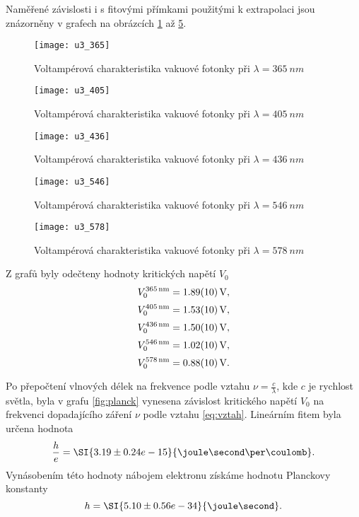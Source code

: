 \documentclass{protokol}
\begin{document}
      Naměřené závislosti i s fitovými přímkami použitými k extrapolaci jsou znázorněny v grafech na obrázcích \ref{fig:u3_365} až \ref{fig:u3_578}.

      \begin{figure}[H]
        \centering
        \texttt{[image: u3\_365]}
        \caption{Voltampérová charakteristika vakuové fotonky při $\lambda = \SI{365}{nm}$}
        \label{fig:u3_365}
      \end{figure}

      \begin{figure}[H]
        \centering
        \texttt{[image: u3\_405]}
        \caption{Voltampérová charakteristika vakuové fotonky při $\lambda = \SI{405}{nm}$}
        \label{fig:u3_405}
      \end{figure}

      \begin{figure}[H]
        \centering
        \texttt{[image: u3\_436]}
        \caption{Voltampérová charakteristika vakuové fotonky při $\lambda = \SI{436}{nm}$}
        \label{fig:u3_436}
      \end{figure}

      \begin{figure}[H]
        \centering
        \texttt{[image: u3\_546]}
        \caption{Voltampérová charakteristika vakuové fotonky při $\lambda = \SI{546}{nm}$}
        \label{fig:u3_546}
      \end{figure}

      \begin{figure}[H]
        \centering
        \texttt{[image: u3\_578]}
        \caption{Voltampérová charakteristika vakuové fotonky při $\lambda = \SI{578}{nm}$}
        \label{fig:u3_578}
      \end{figure}

    Z grafů byly odečteny hodnoty kritických napětí $V_0$
    $$ V_0^{\SI{365}{nm}} = \SI{1.89 \pm 0.1}{V}, $$
    $$ V_0^{\SI{405}{nm}} = \SI{1.53 \pm 0.1}{V}, $$
    $$ V_0^{\SI{436}{nm}} = \SI{1.50 \pm 0.1}{V}, $$
    $$ V_0^{\SI{546}{nm}} = \SI{1.02 \pm 0.1}{V}, $$
    $$ V_0^{\SI{578}{nm}} = \SI{0.88 \pm 0.1}{V}. $$

    Po přepočtení vlnových délek na frekvence podle vztahu $\nu = \frac{c}{\lambda}$, kde $c$ je rychlost světla, byla v grafu \ref{fig:planck} vynesena závislost kritického napětí $V_0$ na frekvenci dopadajícího záření $\nu$ podle vztahu \eqref{eq:vztah}. Lineárním fitem byla určena hodnota
    $$ \frac{h}{e} = \SI{3.19 \pm 0.24 e-15}{\joule\second\per\coulomb}.$$
    Vynásobením této hodnoty nábojem elektronu získáme hodnotu Planckovy konstanty 
    $$ h = \SI{5.10 \pm 0.56 e-34}{\joule\second}. $$
\end{document}
